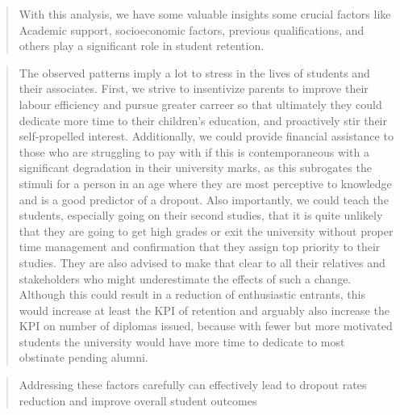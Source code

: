 \documentclass[
  letterpaper,
  DIV=11,
  numbers=noendperiod]{scrartcl}
\begin{document}
\begin{quote}
With this analysis, we have some valuable insights some crucial factors
like Academic support, socioeconomic factors, previous qualifications,
and others play a significant role in student retention.
\end{quote}

\begin{quote}
The observed patterns imply a lot to stress in the lives of students and
their associates. First, we strive to insentivize parents to improve
their labour efficiency and pursue greater carreer so that ultimately
they could dedicate more time to their children's education, and
proactively stir their self-propelled interest. Additionally, we could
provide financial assistance to those who are struggling to pay with if
this is contemporaneous with a significant degradation in their
university marks, as this subrogates the stimuli for a person in an age
where they are most perceptive to knowledge and is a good predictor of a
dropout. Also importantly, we could teach the students, especially going
on their second studies, that it is quite unlikely that they are going
to get high grades or exit the university without proper time management
and confirmation that they assign top priority to their studies. They
are also advised to make that clear to all their relatives and
stakeholders who might underestimate the effects of such a change.
Although this could result in a reduction of enthusiastic entrants, this
would increase at least the KPI of retention and arguably also increase
the KPI on number of diplomas issued, because with fewer but more
motivated students the university would have more time to dedicate to
most obstinate pending alumni.
\end{quote}

\begin{quote}
Addressing these factors carefully can effectively lead to dropout rates
reduction and improve overall student outcomes
\end{quote}


\printbibliography
\end{document}

